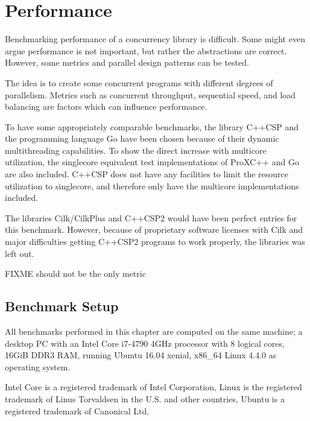 
\chapter{Performance}
\label{ch:performance}

Benchmarking performance of a concurrency library is difficult. Some might even argue performance is not important, but rather the abstractions are correct. However, some metrics and parallel design patterns can be tested. 

The idea is to create some concurrent programs with different degrees of parallelism. Metrics such as concurrent throughput, sequential speed, and load balancing are factors which can influence performance.

To have some appropriately comparable benchmarks, the library C++CSP and the programming language Go have been chosen because of their dynamic multithreading capabilities. To show the direct increase with multicore utilization, the singlecore equivalent test implementations of ProXC++ and Go are also included. C++CSP does not have any facilities to limit the resource utilization to singlecore, and therefore only have the multicore implementations included.

The libraries Cilk/CilkPlus and C++CSP2 would have been perfect entries for this benchmark. However, because of proprietary software licenses with Cilk and major difficulties getting C++CSP2 programs to work properly, the libraries was left out.

FIXME should not be the only metric


\section{Benchmark Setup}
\label{sec:benchmark_setup}

All benchmarks performed in this chapter are computed on the same machine; a desktop PC with an Intel\textregistered{} Core\texttrademark{} i7-4790 4GHz processor with 8 logical cores, 16GiB DDR3 RAM, running Ubuntu\textregistered{} 16.04 xenial, x86\_64 Linux\textregistered{} 4.4.0 as operating system.

Intel Core is a registered trademark of Intel Corporation, Linux is the registered trademark of Linus Torvaldsen in the U.S. and other countries, Ubuntu is a registered trademark of Canonical Ltd.


